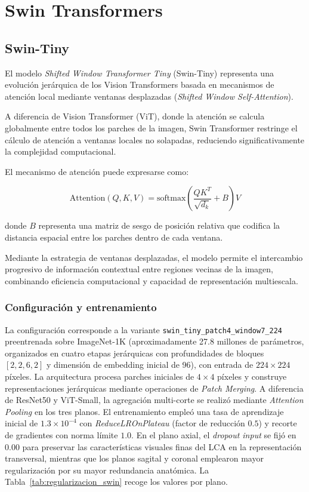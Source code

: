 \section{Swin Transformers}

\subsection{Swin-Tiny}
\label{subsec:swin_small}

El modelo \textit{Shifted Window Transformer Tiny} (Swin-Tiny) \cite{liu2021swin} representa una evolución jerárquica de los Vision Transformers basada en mecanismos de atención local mediante ventanas desplazadas (\textit{Shifted Window Self-Attention}).

A diferencia de Vision Transformer (ViT), donde la atención se calcula globalmente entre todos los parches de la imagen, Swin Transformer restringe el cálculo de atención a ventanas locales no solapadas, reduciendo significativamente la complejidad computacional.

El mecanismo de atención puede expresarse como:

\begin{equation}
\text{Attention}(Q,K,V) =
\text{softmax}
\left(
\frac{QK^T}{\sqrt{d_k}} + B
\right)V
\end{equation}

donde $B$ representa una matriz de sesgo de posición relativa que codifica la distancia espacial entre los parches dentro de cada ventana.

Mediante la estrategia de ventanas desplazadas, el modelo permite el intercambio progresivo de información contextual entre regiones vecinas de la imagen, combinando eficiencia computacional y capacidad de representación multiescala.

\subsubsection{Configuración y entrenamiento}

La configuración corresponde a la variante \texttt{swin\_tiny\_patch4\_window7\_224} preentrenada sobre ImageNet-1K (aproximadamente 27.8 millones de parámetros, organizados en cuatro etapas jerárquicas con profundidades de bloques $[2,2,6,2]$ y dimensión de embedding inicial de 96), con entrada de $224 \times 224$ píxeles. La arquitectura procesa parches iniciales de $4 \times 4$ píxeles y construye representaciones jerárquicas mediante operaciones de \textit{Patch Merging}. A diferencia de ResNet50 y ViT-Small, la agregación multi-corte se realizó mediante \textit{Attention Pooling} en los tres planos. El entrenamiento empleó una tasa de aprendizaje inicial de $1.3 \times 10^{-4}$ con \textit{ReduceLROnPlateau} (factor de reducción $0.5$) y recorte de gradientes con norma límite $1.0$. En el plano axial, el \textit{dropout input} se fijó en 0.00 para preservar las características visuales finas del LCA en la representación transversal, mientras que los planos sagital y coronal emplearon mayor regularización por su mayor redundancia anatómica. La Tabla~\ref{tab:regularizacion_swin} recoge los valores por plano.

